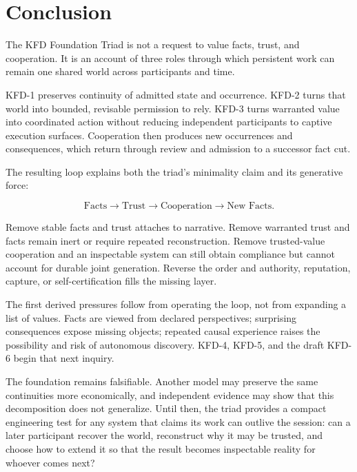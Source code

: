 \section{Conclusion}

The KFD Foundation Triad is not a request to value facts, trust, and
cooperation. It is an account of three roles through which persistent work can
remain one shared world across participants and time.

KFD-1 preserves continuity of admitted state and occurrence. KFD-2 turns that
world into bounded, revisable permission to rely. KFD-3 turns warranted value
into coordinated action without reducing independent participants to captive
execution surfaces. Cooperation then produces new occurrences and
consequences, which return through review and admission to a successor fact
cut.

The resulting loop explains both the triad's minimality claim and its
generative force:

\begin{equation}
\text{Facts} \rightarrow \text{Trust} \rightarrow \text{Cooperation}
\rightarrow \text{New Facts}.
\end{equation}

Remove stable facts and trust attaches to narrative. Remove warranted trust
and facts remain inert or require repeated reconstruction. Remove
trusted-value cooperation and an inspectable system can still obtain
compliance but cannot account for durable joint generation. Reverse the order
and authority, reputation, capture, or self-certification fills the missing
layer.

The first derived pressures follow from operating the loop, not from expanding
a list of values. Facts are viewed from declared perspectives; surprising
consequences expose missing objects; repeated causal experience raises the
possibility and risk of autonomous discovery. KFD-4, KFD-5, and the draft
KFD-6 begin that next inquiry.

The foundation remains falsifiable. Another model may preserve the same
continuities more economically, and independent evidence may show that this
decomposition does not generalize. Until then, the triad provides a compact
engineering test for any system that claims its work can outlive the session:
can a later participant recover the world, reconstruct why it may be trusted,
and choose how to extend it so that the result becomes inspectable reality for
whoever comes next?
